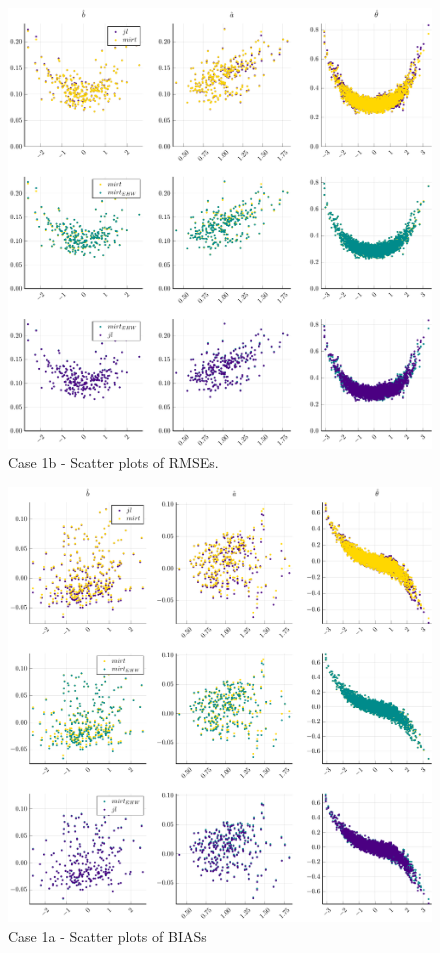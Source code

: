 \begin{figure}[ht]
	\centering
	\includegraphics[width=\textwidth]{Figures/1a/RMSEscatter.pdf}
	\caption{Case 1b - Scatter plots of RMSEs.}
	\label{fig:spRMSE1a}
\end{figure}
\begin{figure}[ht]
	\centering
	\includegraphics[width=\textwidth]{Figures/1a/BIASscatter.pdf}
	\caption{Case 1a - Scatter plots of BIASs }
	\label{fig:spBIAS1a}
\end{figure}
